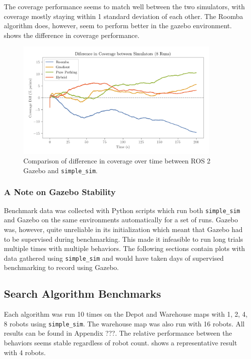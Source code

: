 The coverage performance seems to match well between the two simulators, with coverage mostly staying within 1 standard deviation of each other. 
The Roomba algorithm does, however, seem to perform better in the gazebo environment.
 shows the difference in coverage performance.

\begin{figure}[H]
    \begin{center}
        \includegraphics[width=0.90\textwidth]{./figures/plots/consistency/sim_coverage_diff.png}
    \end{center}
    \caption{Comparison of difference in coverage over time between ROS 2 Gazebo and \texttt{simple\_sim}.}
    \label{fig:coverage-benchmark-diff}
\end{figure}

\subsubsection{A Note on Gazebo Stability}
Benchmark data was collected with Python scripts which run both \texttt{simple\_sim} and Gazebo on the same environments automatically for a set of runs. Gazebo was, however, quite unreliable in its initialization which meant that Gazebo had to be supervised during benchmarking. This made it infeasible to run long trials multiple times with multiple behaviors. The following sections contain plots with data gathered using \texttt{simple\_sim} and would have taken days of supervised benchmarking to record using Gazebo.

\subsection{Search Algorithm Benchmarks}
\label{sec:search-algorithms-benchmark}
Each algorithm was run 10 times on the Depot and Warehouse maps with 1, 2, 4, 8 robots using \texttt{simple\_sim}. The warehouse map was also run with 16 robots. All results can be found in {\color{red} Appendix ???}. The relative performance between the behaviors seems stable regardless of robot count.  shows a representative result with 4 robots.

